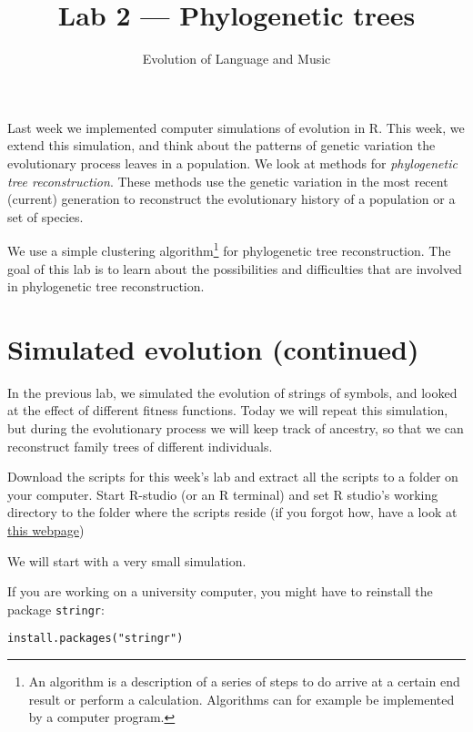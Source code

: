 \documentclass[a4paper, 9pt]{article}
\title{Lab 2 --- Phylogenetic trees}
\author{Evolution of Language and Music}
\begin{document}
\maketitle

\begin{goals}
Last week we implemented computer simulations of evolution in R. This
week, we extend this simulation, and think about the patterns of genetic
variation the evolutionary process leaves in a population. We look at
methods for \emph{phylogenetic tree reconstruction}. These methods use
the genetic variation in the most recent (current) generation to
reconstruct the evolutionary history of a population or a set of
species.

We use a simple clustering
algorithm\footnote{An algorithm is a description of a series of steps to do arrive at a certain end result or perform a calculation. Algorithms can for example be implemented by a computer program.}
for phylogenetic tree reconstruction. The goal of this lab is to learn
about the possibilities and difficulties that are involved in
phylogenetic tree reconstruction.
\end{goals}

\section{Simulated evolution
(continued)}\label{simulated-evolution-continued}

In the previous lab, we simulated the evolution of strings of symbols,
and looked at the effect of different fitness functions. Today we will
repeat this simulation, but during the evolutionary process we will keep
track of ancestry, so that we can reconstruct family trees of different
individuals.

\begin{exercise}
\action Download the scripts for this week's lab and extract all the scripts to a folder on your computer.
\action Start R-studio (or an R terminal) and set R studio's working directory to the folder where the scripts reside (if you forgot how, have a look at \href{https://support.rstudio.com/hc/en-us/articles/200711843-Working-Directories-and-Workspaces}{this webpage})
\end{exercise}

We will start with a very small simulation.

\begin{exercise}
\action If you are working on a university computer, you might have to reinstall the package \texttt{stringr}:
\begin{lstlisting}
install.packages("stringr")
\end{lstlisting}
\end{exercise}
\end{document}
